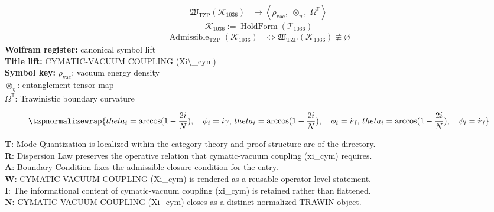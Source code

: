 \noindent
\begin{minipage}[t]{0.48\linewidth}
\begingroup
\small
\[
\begin{aligned}
\mathfrak{W}_{\mathrm{TZP}}\!\left(\mathcal{K}_{1036}\right)
&\longmapsto
\left\langle \rho_{\mathrm{vac}},\; \otimes_{\eta},\; \Omega^{\mathbb{T}} \right\rangle
\end{aligned}
\]
\[
\mathcal{K}_{1036}
:=
\operatorname{HoldForm}\!\left(\mathcal{T}_{1036}\right)
\]
\[
\begin{aligned}
\operatorname{Admissible}_{\mathrm{TZP}}\!\left(\mathcal{K}_{1036}\right)
&\Longleftrightarrow
\mathfrak{W}_{\mathrm{TZP}}\!\left(\mathcal{K}_{1036}\right)\not\equiv\varnothing
\end{aligned}
\]
\textbf{Wolfram register:} canonical symbol lift\\
\textbf{Title lift:} CYMATIC-VACUUM COUPLING (Xi\textbackslash{}\_cym)\\
\textbf{Symbol key:} \(\rho_{\mathrm{vac}}\): vacuum energy density\\ \(\otimes_{\eta}\): entanglement tensor map\\ \(\Omega^{\mathbb{T}}\): Trawinistic boundary curvature
\par
\endgroup
\end{minipage}\hfill
\begin{minipage}[t]{0.48\linewidth}
\[
\tzpnormalizewrap{theta_i = \arccos(1 - \frac{2i}{N}), \quad \phi_i = i\gamma,\,theta_i = \arccos(1 - \frac{2i}{N}), \quad \phi_i = i\gamma,\,theta_i = \arccos(1 - \frac{2i}{N}), \quad \phi_i = i\gamma}
\]

\small
\textbf{T}: Mode Quantization is localized within the category theory and proof structure arc of the directory.\\
\textbf{R}: Dispersion Law preserves the operative relation that cymatic-vacuum coupling (xi\_cym) requires.\\
\textbf{A}: Boundary Condition fixes the admissible closure condition for the entry.\\
\textbf{W}: CYMATIC-VACUUM COUPLING (Xi\_cym) is rendered as a reusable operator-level statement.\\
\textbf{I}: The informational content of cymatic-vacuum coupling (xi\_cym) is retained rather than flattened.\\
\textbf{N}: CYMATIC-VACUUM COUPLING (Xi\_cym) closes as a distinct normalized TRAWIN object.
\normalsize
\end{minipage}


